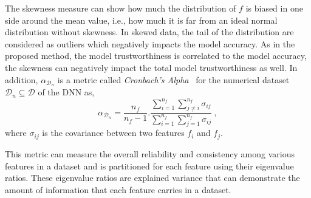 The skewness measure can show how much the distribution of $f$ is biased in one side around the mean value, i.e., how much it is far from an ideal normal distribution without skewness. In skewed data, the tail of the distribution are considered as outliers which negatively impacts the model accuracy. {\color{blue} As in the proposed method, the model trustworthiness is correlated to the model accuracy, the skewness can negatively impact the total model trustworthiness as well.} In addition, ${\alpha}_{\mathcal{D}_n}$ is a metric called \textit{Cronbach's Alpha}~\cite{cronbach} for the numerical dataset $\mathcal{D}_n \subseteq \mathcal{D}$ of the DNN as, 
\begin{equation}
    {\alpha}_{\mathcal{D}_n} = \frac{n_f}{n_f - 1}.\frac{\sum_{i=1}^{n_f}\sum_{j \neq i}^{n_f} {\sigma}_{ij}}{\sum_{i=1}^{n_f}\sum_{j=1}^{n_f} {\sigma}_{ij}}\ ,
\label{cronbach}    
\end{equation}
where ${\sigma}_{ij}$ is the covariance between two features $f_i$ and $f_j$. 

This metric can measure the overall reliability and consistency among various features in a dataset and is partitioned for each feature using their eigenvalue ratios. These eigenvalue ratios are explained variance that can demonstrate the amount of information that each feature carries in a dataset. 

